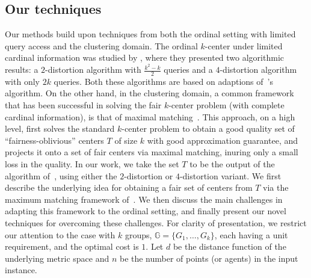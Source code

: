 \documentclass{article}
\begin{document}
\subsection{Our techniques}
Our methods build upon techniques from both the ordinal setting with limited query access and the clustering domain.
The ordinal $k$-center under limited cardinal information was studied by
\citet{burkhardt2024low}, where they presented two algorithmic results: a $2$-distortion algorithm with $\frac{k^2-k}{2}$ queries and a $4$-distortion algorithm with only $2k$ queries. Both these algorithms are based on adaptions of~\citet{gonzalez1985clustering}'s algorithm.
On the other hand, in the clustering domain,
a common framework that has been successful in solving the fair $k$-center problem (with complete cardinal information), is that of maximal matching~\cite{jones2020fair,gadekar2025fair}.
This approach, on a high level,  first solves the standard $k$-center problem to obtain a good quality set of ``fairness-oblivious'' centers $T$ of size $k$ with good approximation guarantee, and
projects it onto a set of fair centers via maximal matching, inuring only a small loss in the quality.
In our work, we take the set $T$ to be the output of the algorithm of~\cite{burkhardt2024low}, using either the $2$-distortion or $4$-distortion variant. We first describe the underlying idea for obtaining a fair set of centers from $T$ via the maximum matching framework of~\cite{jones2020fair,gadekar2025fair}. We then discuss the main challenges in adapting this framework to the ordinal setting, and finally present our novel techniques for overcoming these challenges.
For clarity of presentation, we restrict our attention to the case with $k$ groups, $\mathbb{G}=\{G_1,\dots,G_k\}$, each having a unit requirement, and the optimal cost is $1$. 
Let $d$ be the distance function of the underlying metric space and $n$ be the number of points (or agents) in the input instance.
\end{document}
